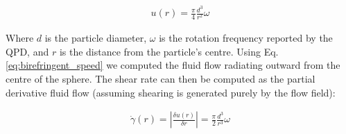 \documentclass[a4paper,oneside,11pt]{book}
\begin{document}
\begin{align}
	\label{eq:birefringent_speed}
	u(r) = \frac{\pi}{4}\frac{d^3}{r^2}\omega
\end{align}

Where $d$ is the particle diameter, $\omega$ is the rotation frequency reported by the QPD, and $r$ is the distance from the particle's centre. Using Eq.\ref{eq:birefringent_speed} we computed the fluid flow radiating outward from the centre of the sphere. The shear rate can then be computed as the partial derivative fluid flow (assuming shearing is generated purely by the flow field):

\begin{align}
	\label{eq:birefringent_shear}
	\dot{\gamma}(r)=\left|\frac{\delta u(r)}{\delta r} \right|= \frac{\pi}{2}\frac{d^3}{r^3}\omega
\end{align}
\end{document}

